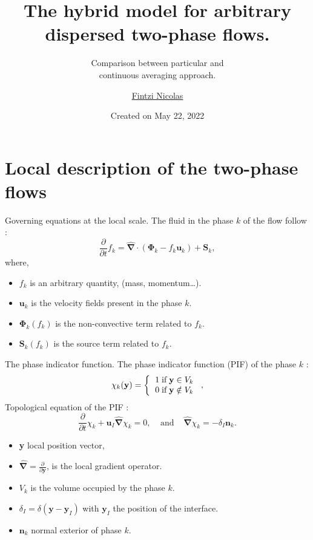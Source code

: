 \documentclass{sintefbeamer}
\title{The hybrid model for arbitrary dispersed two-phase flows.}
\subtitle{Comparison between particular and \\continuous averaging approach.}
\author{\href{mailto:qilong-kirov.liu@connect.polyu.hk}{Fintzi Nicolas}}
\date{Created on May 22, 2022}
\newcommand{\nablabh}{\hat{\bm{\nabla}}}
\newcommand{\pddt}{\frac{\partial}{\partial t}}
\begin{document}
\maketitle

\section{Local description of the two-phase flows}

\begin{frame}{Governing equations at the local scale.}
  The fluid in the phase $k$ of the flow follow :
  \begin{equation}
    \pddt f_k
    = \nablabh \cdot \left(
        \bm{\Phi}_k
        - f_k\textbf{u}_k
        \right)
    + \textbf{S}_k,
    \label{eq:general_conservation}
\end{equation}
where,
\begin{itemize}
  \item $f_k$ is an arbitrary quantity, (mass, momentum\ldots).
  \item $\textbf{u}_k$ is the velocity fields present in the phase $k$. 
  \item $\bm{\Phi}_k(f_k)$ is the non-convective term related to $f_k$.
  \item $\textbf{S}_k(f_k)$ is the source term related to $f_k$.
\end{itemize}
\end{frame}

\begin{frame}{The phase indicator function.}
  The phase indicator function (PIF) of the phase $k$ :
  \begin{equation}
    \chi_k(\textbf{y}) =  \left\{
      \begin{tabular}{cc}
        $1 \;\text{if} \;\textbf{y} \in V_k$\\
        $0 \;\text{if} \;\textbf{y} \notin V_k$
      \end{tabular}
      \right.,
      \label{eq:phase_indicator}
\end{equation}
Topological equation of the PIF :
\begin{equation}
  \pddt \chi_k
  + \textbf{u}_I  \nablabh \chi_k 
  = 0, \;\;\;\;\text{and}\;\;\;\;
    \nablabh \chi_k 
    = - \delta_I \textbf{n}_k.
  \label{eq:phaseindicator_transport}
\end{equation}

\begin{itemize}
  \item \textbf{y} local position vector,
  \item $\nablabh = \frac{\partial}{\partial \textbf{y}}$, is the local gradient operator.
  \item  $V_k$ is the volume occupied by the phase $k$.
  \item $\delta_I = \delta(\textbf{y} - \textbf{y}_I)$ with $\textbf{y}_I$ the position of the interface.
  \item $\textbf{n}_k$ normal exterior of phase $k$.
\end{itemize}
\end{frame}
\end{document}
